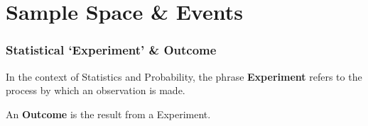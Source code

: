 \documentclass[compress]{beamer}
\begin{document}
\section{ Sample Space \& Events}







\begin{frame}
	\frametitle{ Statistical `Experiment' \& Outcome}
	\begin{center}
	\begin{definition}[ ``Experiment'']
  In the context of Statistics and Probability,  the phrase {\bf Experiment } refers to the process by which an observation is made.\\
\vspace{.1in}
\end{definition}
\vspace{-.2in}
\vspace{.5in}
\pause

\begin{definition}[Outcome]
 An {\bf Outcome } is the result from a Experiment. \\
\vspace{.2in}
\end{definition}
\vspace{-.2in}
	\vspace{2in}
	\end{center}
\end{frame}
\end{document}
